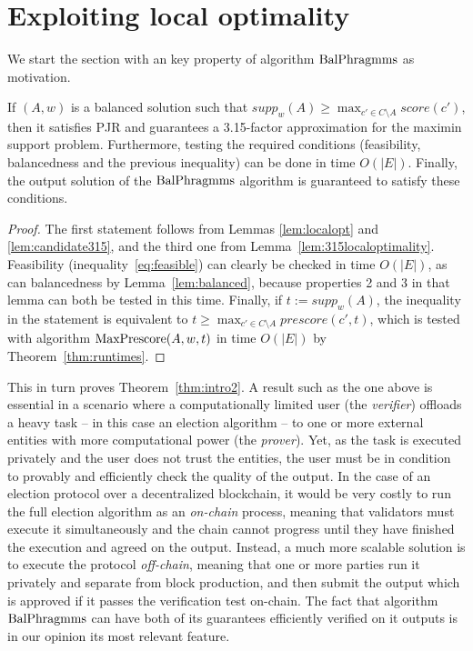 \section{Exploiting local optimality}\label{s:local}

We start the section with an key property of algorithm $\operatorname{BalPhragmms}$ as motivation.

\begin{theorem}\label{thm:315guarantee}
If $(A,w)$ is a balanced solution such that $supp_w(A)\geq \max_{c'\in C\setminus A} score(c')$, then it satisfies PJR and guarantees a 3.15-factor approximation for the maximin support problem. 
Furthermore, testing the required conditions (feasibility, balancedness and the previous inequality) can be done in time $O(|E|)$. 
Finally, the output solution of the $\operatorname{BalPhragmms}$ algorithm is guaranteed to satisfy these conditions.
\end{theorem}
\begin{proof}
The first statement follows from Lemmas \ref{lem:localopt} and \ref{lem:candidate315}, and the third one from Lemma~\ref{lem:315localoptimality}. 
Feasibility (inequality~\ref{eq:feasible}) can clearly be checked in time $O(|E|)$, as can balancedness by Lemma~\ref{lem:balanced}, because properties 2 and 3 in that lemma can both be tested in this time. 
Finally, if $t:=supp_w(A)$, the inequality in the statement is equivalent to $t\geq \max_{c'\in C\setminus A} prescore(c',t)$, which is tested with algorithm $\operatorname{MaxPrescore}(A,w,t)$ in time $O(|E|)$ by Theorem~\ref{thm:runtimes}.
\end{proof}

This in turn proves Theorem~\ref{thm:intro2}. 
A result such as the one above is essential in a scenario where a computationally limited user (the \emph{verifier}) offloads a heavy task -- in this case an election algorithm -- to one or more external entities with more computational power (the \emph{prover}). Yet, as the task is executed privately and the user does not trust the entities, the user must be in condition to provably and efficiently check the quality of the output.
%
In the case of an election protocol over a decentralized blockchain, it would be very costly to run the full election algorithm as an \emph{on-chain} process, meaning that validators must execute it simultaneously and the chain cannot progress until they have finished the execution and agreed on the output. 
Instead, a much more scalable solution is to execute the protocol \emph{off-chain}, meaning that one or more parties run it privately and separate from block production, and then submit the output which is approved if it passes the verification test on-chain. 
The fact that algorithm $\operatorname{BalPhragmms}$ can have both of its guarantees efficiently verified on it outputs is in our opinion its most relevant feature. 

